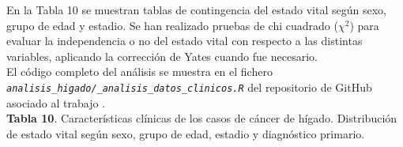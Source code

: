 En la Tabla 10 se muestran tablas de contingencia del estado vital según sexo, grupo de edad y estadio. Se han realizado pruebas de chi cuadrado ($\chi^2$) \cite{Pearson1900} para evaluar la independencia o no del estado vital con respecto a las distintas variables, aplicando la corrección de Yates \cite{Yates1934} cuando fue necesario.\\

El código completo del análisis se muestra en el fichero \textit{\texttt{analisis\_higado/\_analisis\_datos\_clinicos.R}} del repositorio de GitHub asociado al trabajo \cite{Redondo-Sanchez2020}.\\

\textbf{Tabla 10}. Características clínicas de los casos de cáncer de hígado. Distribución de  estado vital según sexo, grupo de edad, estadio y diagnóstico primario.

